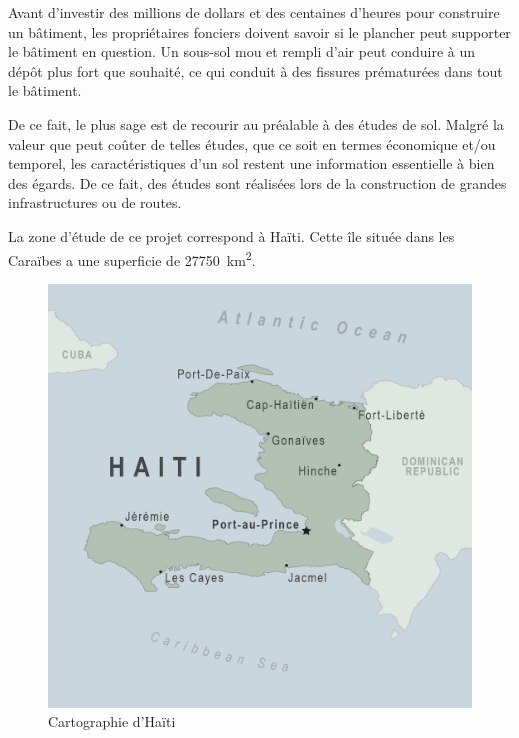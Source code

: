 \par
Avant d’investir des millions de dollars et des centaines d’heures pour 
construire un bâtiment, les propriétaires fonciers doivent savoir si le 
plancher peut supporter le bâtiment en question. Un sous-sol mou et 
rempli d'air peut conduire à un dépôt plus fort que souhaité, ce qui 
conduit à des fissures prématurées dans tout le bâtiment.
\par
De ce fait, le plus sage est de recourir au préalable à des études de sol.   
Malgré la valeur que peut coûter de telles études, que ce soit en termes
économique et/ou temporel, les caractéristiques d’un sol restent une
information essentielle à bien des égards. De ce fait, des études sont 
réalisées lors de la construction de grandes infrastructures ou de routes. 
\par 
La zone d'étude de ce projet correspond à Haïti. 
Cette île située dans les Caraïbes a une superficie de  \SI{27750}{\kilo\metre\squared}.
\begin{figure}
    \centering
    \includegraphics[width=1\textwidth]{map-haiti.png}
    \caption{Cartographie d'Haïti}
\end{figure}